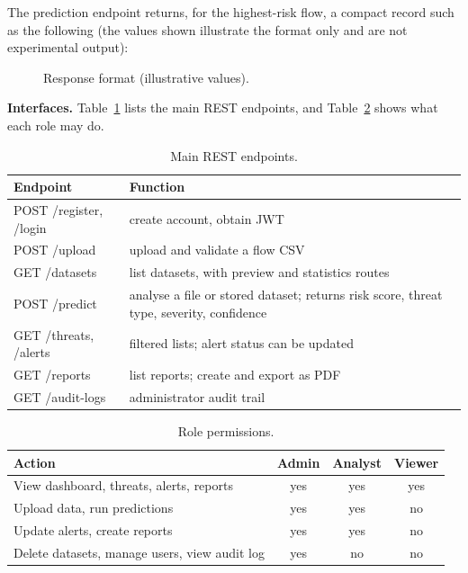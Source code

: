 \documentclass[conference]{IEEEtran}
\begin{document}
The prediction endpoint returns, for the highest-risk flow, a compact record such as the following (the values shown illustrate the format only and are not experimental output):
\begin{figure}[h]
\centering
{}
\caption{Response format (illustrative values).}
\end{figure}

\textbf{Interfaces.} Table~\ref{tab:api} lists the main REST endpoints, and Table~\ref{tab:roles} shows what each role may do.

\begin{table}[!htb]
\caption{Main REST endpoints.}
\label{tab:api}
\centering\footnotesize
\begin{tabular}{@{}p{1.9cm}p{5.4cm}@{}}
\hline
Endpoint & Function \\
\hline
POST /register, /login & create account, obtain JWT \\
POST /upload & upload and validate a flow CSV \\
GET /datasets & list datasets, with preview and statistics routes \\
POST /predict & analyse a file or stored dataset; returns risk score, threat type, severity, confidence \\
GET /threats, /alerts & filtered lists; alert status can be updated \\
GET /reports & list reports; create and export as PDF \\
GET /audit-logs & administrator audit trail \\
\hline
\end{tabular}
\end{table}

\begin{table}[!htb]
\caption{Role permissions.}
\label{tab:roles}
\centering\footnotesize
\begin{tabular}{@{}lccc@{}}
\hline
Action & Admin & Analyst & Viewer \\
\hline
View dashboard, threats, alerts, reports & yes & yes & yes \\
Upload data, run predictions & yes & yes & no \\
Update alerts, create reports & yes & yes & no \\
Delete datasets, manage users, view audit log & yes & no & no \\
\hline
\end{tabular}
\end{table}
\end{document}
